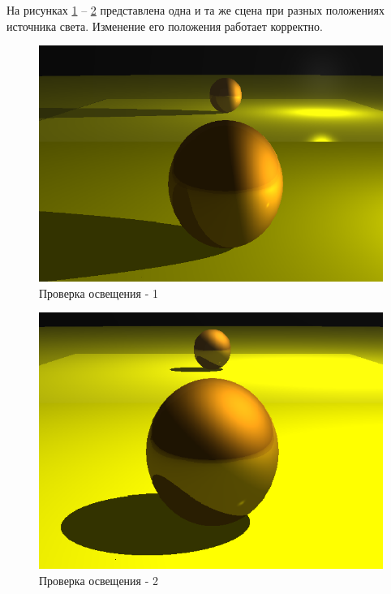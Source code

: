 На рисунках \ref{light_1} -- \ref{light_2} представлена одна и та же сцена при разных положениях источника света. Изменение его положения работает корректно.

\begin{figure}[H]
	\begin{center}
		\includegraphics[scale=0.53]{assets/light_1.png}
	\end{center}
	\caption{Проверка освещения - 1}
	\label{light_1}
\end{figure}

\begin{figure}[H]
	\begin{center}
		\includegraphics[scale=0.6]{assets/light_2.png}
	\end{center}
	\caption{Проверка освещения - 2}
	\label{light_2}
\end{figure}

